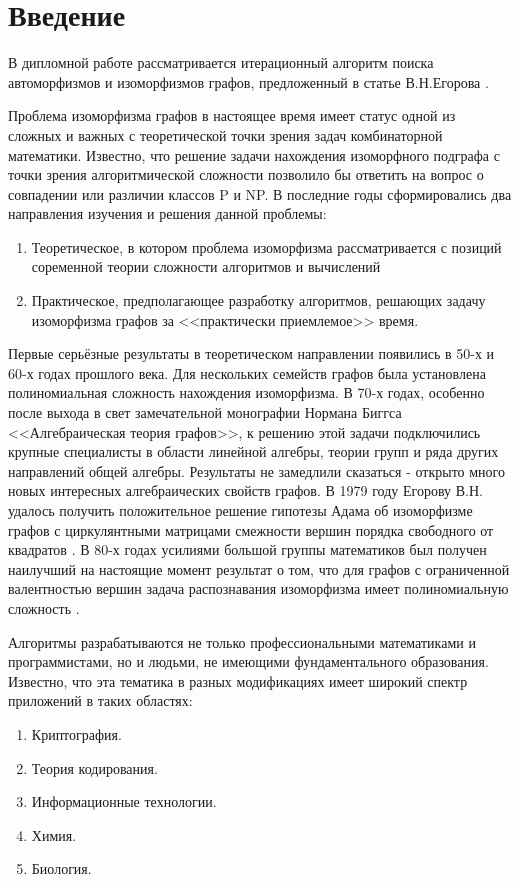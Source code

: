 \section*{Введение}
\label{sec:Introduction} 
\large 

В дипломной работе рассматривается итерационный алгоритм поиска автоморфизмов и изоморфизмов графов, предложенный в статье В.Н.Егорова \cite{Egorov_article}.

Проблема изоморфизма графов в настоящее время имеет статус одной из сложных и важных с теоретической точки зрения задач комбинаторной математики. Известно, что решение задачи нахождения изоморфного подграфа с точки зрения алгоритмической сложности позволило бы ответить на вопрос о совпадении или различии классов P и NP. В последние годы сформировались два направления изучения и решения данной проблемы:
\begin{enumerate}
\item Теоретическое, в котором проблема изоморфизма рассматривается с позиций соременной теории сложности алгоритмов и вычислений
\item Практическое, предполагающее разработку алгоритмов, решающих задачу изоморфизма графов за <<практически приемлемое>> время.
\end{enumerate}

Первые серьёзные результаты в теоретическом направлении появились в 50-х и 60-х годах прошлого века. Для нескольких семейств графов была установлена полиномиальная сложность нахождения изоморфизма. В 70-х годах, особенно после выхода в свет замечательной монографии Нормана Биггса <<Алгебраическая теория графов>>, к решению этой задачи подключились крупные специалисты в области линейной алгебры, теории групп и ряда других направлений общей алгебры. Результаты не замедлили сказаться - открыто много новых интересных алгебраических свойств графов. В 1979 году Егорову В.Н. удалось получить положительное решение гипотезы Адама об изоморфизме графов с циркулянтными матрицами смежности вершин порядка свободного от квадратов \cite{Egorov_Markov_article}. В 80-х годах усилиями большой группы математиков был получен наилучший на настоящие момент результат о том, что для графов с ограниченной валентностью вершин задача распознавания изоморфизма имеет полиномиальную сложность \cite{Eugene_article}.

Алгоритмы разрабатываются не только профессиональными математиками и программистами, но и людьми, не имеющими фундаментального образования. Известно, что эта тематика в разных модификациях имеет широкий спектр приложений в таких областях:
\begin{enumerate}
\item Криптография.
\item Теория кодирования.
\item Информационные технологии.
\item Химия.
\item Биология.
\end{enumerate}

